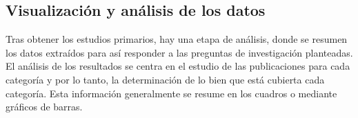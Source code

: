 \subsection{Visualización y análisis de los datos}
Tras obtener los estudios primarios, hay una etapa de análisis, donde se resumen los datos extraídos para así responder a las preguntas de investigación planteadas.
El análisis de los resultados se centra en el estudio de las publicaciones para cada categoría y por lo tanto, la determinación de lo bien que está cubierta cada categoría. Esta información generalmente se resume en los cuadros o mediante gráficos de barras. %



